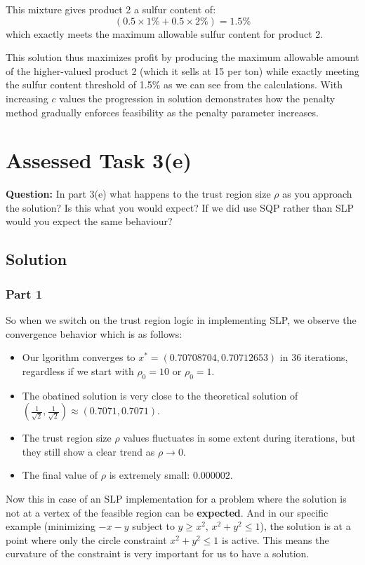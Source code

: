 \documentclass{article}
\begin{document}
This mixture gives product 2 a sulfur content of:
\[

(0.5 \times 1\% + 0.5 \times 2\%) = 1.5\%
\]
which exactly meets the maximum allowable sulfur content for product 2.

This solution thus maximizes profit by producing the maximum allowable amount of the higher-valued product 2 (which it sells at 15 per ton) while exactly meeting the sulfur content threshold of 1.5\% as we can see from the calculations. With increasing $c$ values the progression in solution demonstrates how the penalty method gradually enforces feasibility as the penalty parameter increases.

\newpage
\section{Assessed Task 3(e)}
\textbf{Question:} In part 3(e) what happens to the trust region size $\rho$ as you approach the solution? Is this what you would expect? If we did use SQP rather than SLP would you expect the same behaviour?

\subsection{Solution}
\subsubsection{Part 1}
So when we switch on the trust region logic in implementing SLP, we observe the convergence behavior which is as follows:

\begin{itemize}
    \item Our lgorithm converges to $x^* = (0.70708704, 0.70712653)$ in 36 iterations, regardless if we start with $\rho_0 = 10$ or $\rho_0 = 1$.
    \item The obatined solution is very close to the theoretical solution of $(\frac{1}{\sqrt{2}}, \frac{1}{\sqrt{2}}) \approx (0.7071, 0.7071)$.
    \item The trust region size $\rho$ values fluctuates in some extent during iterations, but they still show a clear trend as $\rho \rightarrow 0$.
    \item The final value of $\rho$ is extremely small: $0.000002$.
\end{itemize}

Now this in case of an SLP implementation for a problem where the solution is not at a vertex of the feasible region can be \textbf{expected}. And in our specific example (minimizing $-x-y$ subject to $y \geq x^2$, $x^2 + y^2 \leq 1$), the solution is at a point where only the circle constraint $x^2 + y^2 \leq 1$ is active. This means the curvature of the constraint is very important for us to have a solution.
\end{document}
